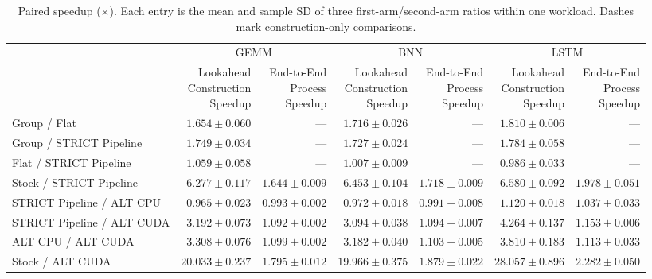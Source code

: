 \begin{table}[t]\centering\small\setlength{\tabcolsep}{4pt}
\caption{Paired speedup ($\times$). Each entry is the mean and sample SD of three first-arm/second-arm ratios within one workload. Dashes mark construction-only comparisons.}\label{tab:ratios}
\begin{tabular}{lrrrrrr}\toprule
 & \multicolumn{2}{c}{GEMM} & \multicolumn{2}{c}{BNN} & \multicolumn{2}{c}{LSTM}\\
 & \shortstack{Lookahead\\Construction\\Speedup} & \shortstack{End-to-End\\Process\\Speedup} & \shortstack{Lookahead\\Construction\\Speedup} & \shortstack{End-to-End\\Process\\Speedup} & \shortstack{Lookahead\\Construction\\Speedup} & \shortstack{End-to-End\\Process\\Speedup}\\\midrule
Group / Flat & $1.654 \pm 0.060$ & --- & $1.716 \pm 0.026$ & --- & $1.810 \pm 0.006$ & ---\\
Group / STRICT Pipeline & $1.749 \pm 0.034$ & --- & $1.727 \pm 0.024$ & --- & $1.784 \pm 0.058$ & ---\\
Flat / STRICT Pipeline & $1.059 \pm 0.058$ & --- & $1.007 \pm 0.009$ & --- & $0.986 \pm 0.033$ & ---\\
Stock / STRICT Pipeline & $6.277 \pm 0.117$ & $1.644 \pm 0.009$ & $6.453 \pm 0.104$ & $1.718 \pm 0.009$ & $6.580 \pm 0.092$ & $1.978 \pm 0.051$\\
STRICT Pipeline / ALT CPU & $0.965 \pm 0.023$ & $0.993 \pm 0.002$ & $0.972 \pm 0.018$ & $0.991 \pm 0.008$ & $1.120 \pm 0.018$ & $1.037 \pm 0.033$\\
STRICT Pipeline / ALT CUDA & $3.192 \pm 0.073$ & $1.092 \pm 0.002$ & $3.094 \pm 0.038$ & $1.094 \pm 0.007$ & $4.264 \pm 0.137$ & $1.153 \pm 0.006$\\
ALT CPU / ALT CUDA & $3.308 \pm 0.076$ & $1.099 \pm 0.002$ & $3.182 \pm 0.040$ & $1.103 \pm 0.005$ & $3.810 \pm 0.183$ & $1.113 \pm 0.033$\\
Stock / ALT CUDA & $20.033 \pm 0.237$ & $1.795 \pm 0.012$ & $19.966 \pm 0.375$ & $1.879 \pm 0.022$ & $28.057 \pm 0.896$ & $2.282 \pm 0.050$\\
\bottomrule\end{tabular}\end{table}
